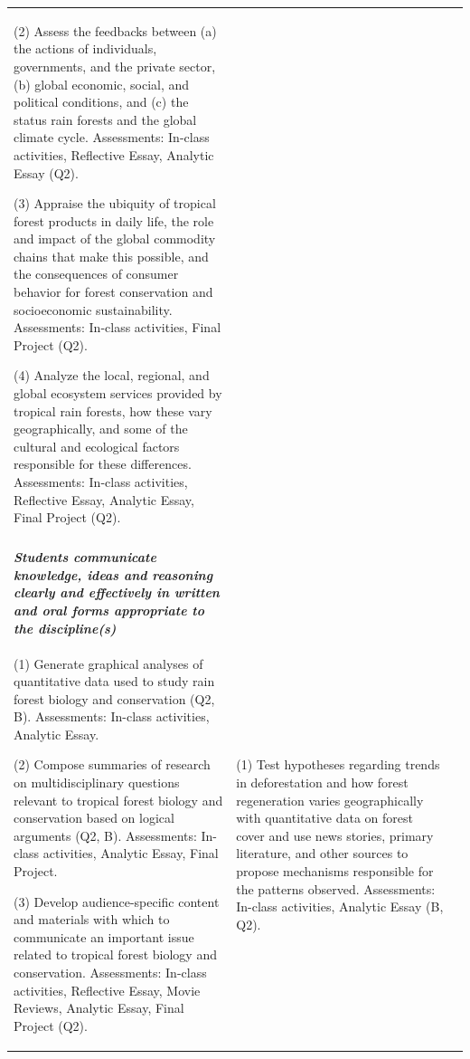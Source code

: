 \documentclass[
  10pt,
  letterpaper,
  oneside,
  open=any]{scrbook}
\begin{document}
\begin{tabular}[t]{>{\raggedright\arraybackslash}p{25em}>{\raggedright\arraybackslash}p{25em}l}
(2) Assess the feedbacks between (a) the actions of individuals, governments, and the private sector, (b) global economic, social, and political conditions, and (c) the status rain forests and the global climate cycle. Assessments: In-class activities, Reflective Essay, Analytic Essay (Q2). 

(3) Appraise the ubiquity of tropical forest products in daily life, the role and impact of the global commodity chains that make this possible, and the consequences of consumer behavior for forest conservation and socioeconomic sustainability. Assessments: In-class activities, Final Project (Q2). 

(4) Analyze the local, regional, and global ecosystem services provided by tropical rain forests, how these vary geographically, and some of the cultural and ecological factors responsible for these differences. Assessments: In-class activities, Reflective Essay, Analytic Essay, Final Project (Q2). & \cellcolor{white}{\textcolor{black}{}}\\
\cellcolor[HTML]{1F691B}{\textcolor{white}{\textbf{COMMUNICATION}}} & \cellcolor[HTML]{1F691B}{\textcolor{white}{\textbf{CRITICAL THINKING}}} & \cellcolor[HTML]{1F691B}{\textcolor{white}{\textbf{}}}\\
\em{\textbf{Students communicate knowledge, ideas and reasoning clearly and effectively in written and oral forms appropriate to the discipline(s)}} & \em{\textbf{\cellcolor{white}{\textcolor{black}{Students carefully and logically analyze information from multiple perspectives and develop reasoned solutions to problems within the discipline(s).}}}} & \em{\textbf{}}\\
(1) Generate graphical analyses of quantitative data used to study rain forest biology and conservation (Q2, B). Assessments: In-class activities, Analytic Essay. 

(2) Compose summaries of  research on multidisciplinary questions relevant to tropical forest biology and conservation based on logical arguments (Q2, B). Assessments: In-class activities, Analytic Essay, Final Project. 

(3) Develop audience-specific content and materials with which to communicate an important issue related to tropical forest biology and conservation. Assessments: In-class activities,  Reflective Essay, Movie Reviews, Analytic Essay, Final Project (Q2). & (1) Test hypotheses regarding trends in deforestation and how forest regeneration varies geographically with quantitative data on forest cover and use news stories, primary literature, and other sources to propose mechanisms responsible for the patterns observed. Assessments: In-class activities, Analytic Essay  (B, Q2). 


\end{tabular}
\end{document}
